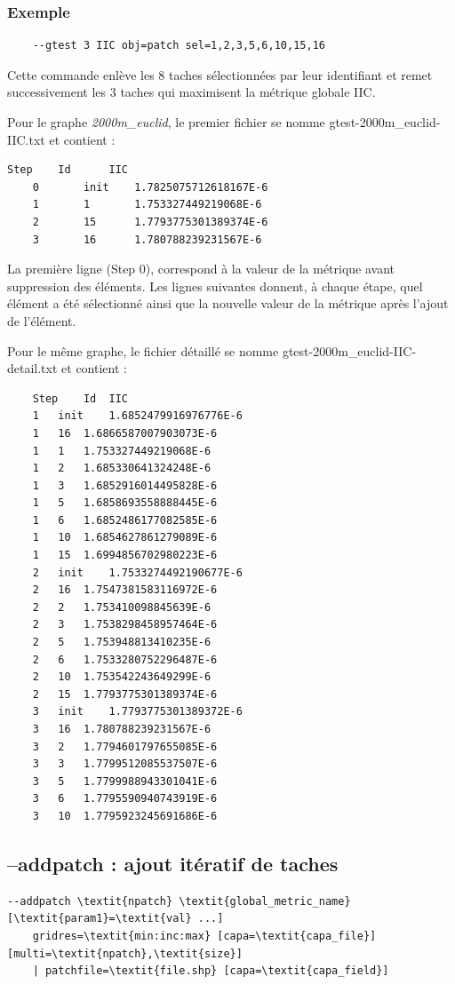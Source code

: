 \documentclass[a4paper,10pt]{report}
\begin{document}
\subsubsection{Exemple}

\begin{Verbatim}
	--gtest 3 IIC obj=patch sel=1,2,3,5,6,10,15,16
\end{Verbatim}

Cette commande enlève les 8 taches sélectionnées par leur identifiant et remet successivement les 3 taches qui maximisent la métrique globale IIC.

Pour le graphe \textit{2000m\_euclid}, le premier fichier se nomme gtest-2000m\_euclid-IIC.txt et contient :
\begin{Verbatim}[tabsize=4]
	Step	Id		IIC
	0		init	1.7825075712618167E-6
	1		1		1.753327449219068E-6
	2		15		1.7793775301389374E-6
	3		16		1.780788239231567E-6
\end{Verbatim}
La première ligne (Step 0), correspond à la valeur de la métrique avant suppression des éléments. Les lignes suivantes donnent, à chaque étape, quel élément a été sélectionné ainsi que la nouvelle valeur de la métrique après l'ajout de l'élément.

Pour le même graphe, le fichier détaillé se nomme gtest-2000m\_euclid-IIC-detail.txt et contient :
\begin{Verbatim}
	Step	Id	IIC
	1	init	1.6852479916976776E-6
	1	16	1.6866587007903073E-6
	1	1	1.753327449219068E-6
	1	2	1.685330641324248E-6
	1	3	1.6852916014495828E-6
	1	5	1.6858693558888445E-6
	1	6	1.6852486177082585E-6
	1	10	1.6854627861279089E-6
	1	15	1.6994856702980223E-6
	2	init	1.7533274492190677E-6
	2	16	1.7547381583116972E-6
	2	2	1.753410098845639E-6
	2	3	1.7538298458957464E-6
	2	5	1.753948813410235E-6
	2	6	1.7533280752296487E-6
	2	10	1.753542243649299E-6
	2	15	1.7793775301389374E-6
	3	init	1.7793775301389372E-6
	3	16	1.780788239231567E-6
	3	2	1.7794601797655085E-6
	3	3	1.7799512085537507E-6
	3	5	1.7799988943301041E-6
	3	6	1.7795590940743919E-6
	3	10	1.7795923245691686E-6
\end{Verbatim}


\subsection{--addpatch : ajout itératif de taches}
\begin{Verbatim}[commandchars=\\\{\}]
--addpatch \textit{npatch} \textit{global_metric_name} [\textit{param1}=\textit{val} ...]
	gridres=\textit{min:inc:max} [capa=\textit{capa_file}] [multi=\textit{npatch},\textit{size}]
	| patchfile=\textit{file.shp} [capa=\textit{capa_field}]
\end{Verbatim}
\end{document}
